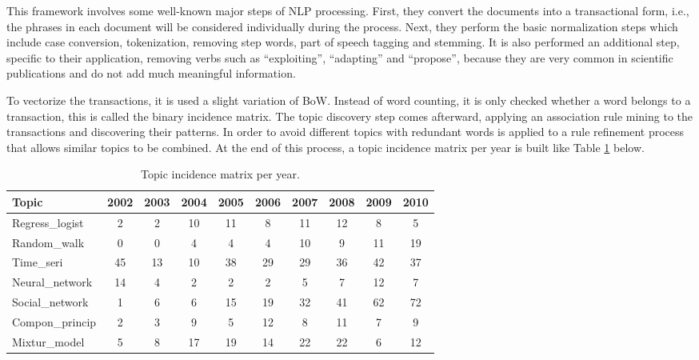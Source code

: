 This framework involves some well-known major steps of NLP processing. First, they convert the documents into a transactional form, i.e., the phrases in each document will be considered individually during the process. Next, they perform the basic normalization steps which include case conversion, tokenization, removing step words, part of speech tagging and stemming. It is also performed an additional step, specific to their application, removing verbs such as ``exploiting'', ``adapting'' and ``propose'', because they are very common in scientific publications and do not add much meaningful information.

To vectorize the transactions, it is used a slight variation of BoW. Instead of word counting, it is only checked whether a word belongs to a transaction, this is called the binary incidence matrix. The topic discovery step comes afterward, applying an association rule mining to the transactions and discovering their patterns. In order to avoid different topics with redundant words is applied to a rule refinement process that allows similar topics to be combined. At the end of this process, a topic incidence matrix per year is built like Table \ref{tab:incidence-matrix} below.

\begin{table}[h!]
	\centering
	\caption{Topic incidence matrix per year.}
	\label{tab:incidence-matrix}
	\begin{tabular}{l|ccccccccc}
		\toprule
		\textbf{Topic} & \textbf{2002} & \textbf{2003} & \textbf{2004} & \textbf{2005} & \textbf{2006} & \textbf{2007} & \textbf{2008} & \textbf{2009} & \textbf{2010} \\
		\midrule
		Regress\_logist & 2  & 2  & 10 & 11 & 8  & 11 & 12 & 8  & 5  \\
		Random\_walk    & 0  & 0  & 4  & 4  & 4  & 10 & 9  & 11 & 19 \\
		Time\_seri      & 45 & 13 & 10 & 38 & 29 & 29 & 36 & 42 & 37 \\
		Neural\_network & 14 & 4  & 2  & 2  & 2  & 5  & 7  & 12 & 7  \\
		Social\_network & 1  & 6  & 6  & 15 & 19 & 32 & 41 & 62 & 72 \\
		Compon\_princip & 2  & 3  & 9  & 5  & 12 & 8  & 11 & 7  & 9  \\
		Mixtur\_model   & 5  & 8  & 17 & 19 & 14 & 22 & 22 & 6  & 12 \\ \bottomrule
	\end{tabular}
\end{table}

